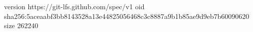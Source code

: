 version https://git-lfs.github.com/spec/v1
oid sha256:5aceaabf3bb8143528a13e44825056468c3c8887a9b1b85ae9d9eb7b60090620
size 262240
